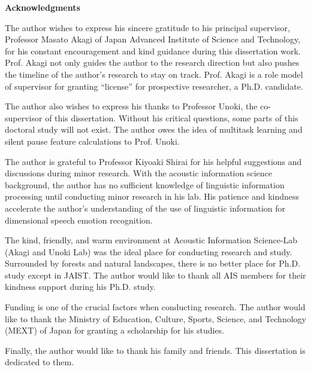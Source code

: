 \thispagestyle{plain}
\renewcommand{\nomname}{ACKNOWLEDGMENTS}
\markboth{\nomname}{\nomname}

\strut
\vspace{20pt}

\begin{center}
{\LARGE\bf Acknowledgments}
\end{center}
\vspace{20pt}

The author wishes to express his sincere gratitude to his principal supervisor,
Professor Masato Akagi of Japan Advanced Institute of Science and Technology,
for his constant encouragement and kind guidance during this dissertation work.
Prof. Akagi not only guides the author to the research direction but also
pushes the timeline of the author's research to stay on track. Prof. Akagi is a
role model of supervisor for granting ``license'' for prospective researcher, a
Ph.D. candidate. 

The author also wishes to express his thanks to Professor Unoki, the
co-supervisor of this dissertation. Without his critical questions, some parts
of this doctoral study will not exist. The author owes the idea of multitask
learning and silent pause feature calculations to Prof. Unoki.

The author is grateful to Professor Kiyoaki Shirai for his helpful suggestions
and discussions during minor research. With the acoustic information science
background, the author has no sufficient knowledge of linguistic information
processing until conducting minor research in his lab. His patience and
kindness accelerate the author's understanding of the use of linguistic
information for dimensional speech emotion recognition.

The kind, friendly, and warm environment at Acoustic Information Science-Lab
(Akagi and Unoki Lab) was the ideal place for conducting research and study.
Surrounded by forests and natural landscapes, there is no better place for 
Ph.D. study except in JAIST. The author would like to thank all AIS members for
their kindness support during his Ph.D. study.

Funding is one of the crucial factors when conducting research. The author
would like to thank the Ministry of Education, Culture, Sports, Science, and
Technology (MEXT) of Japan for granting a scholarship for his studies.

Finally, the author would like to thank his family and friends. This
dissertation is dedicated to them. 

